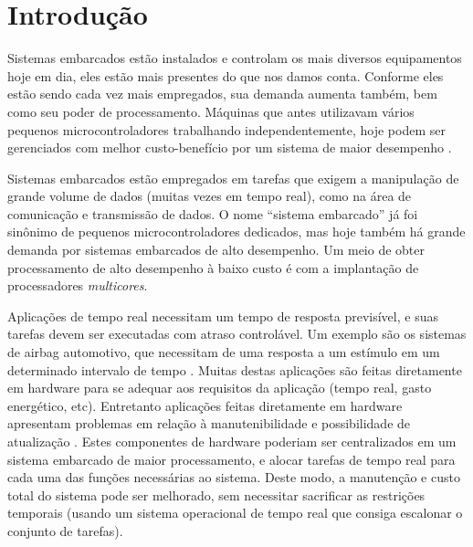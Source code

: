 \chapter{Introdução}


Sistemas embarcados estão instalados e controlam os mais diversos equipamentos hoje em dia, eles estão mais presentes do que nos damos conta. Conforme eles estão sendo cada vez mais empregados, sua demanda aumenta também, bem como seu poder de processamento. Máquinas que antes utilizavam vários pequenos microcontroladores trabalhando independentemente, hoje podem ser gerenciados com melhor custo-benefício por um sistema de maior desempenho \cite{gio}.%


Sistemas embarcados estão empregados em tarefas que exigem a manipulação de grande volume de dados (muitas vezes em tempo real), como na área de comunicação e transmissão de dados. O nome ``sistema embarcado'' já foi sinônimo de pequenos microcontroladores dedicados, mas hoje também há grande demanda por sistemas embarcados de alto desempenho. Um meio de obter processamento de alto desempenho à baixo custo é com a implantação de processadores \emph{multicores}.

Aplicações de tempo real necessitam um tempo de resposta previsível, e suas tarefas devem ser executadas com atraso controlável. Um exemplo são os sistemas de airbag automotivo, que necessitam de uma resposta a um estímulo em um determinado intervalo de tempo \cite{nat}. Muitas destas aplicações são feitas diretamente em hardware para se adequar aos requisitos da aplicação (tempo real, gasto energético, etc). Entretanto aplicações feitas diretamente em hardware apresentam problemas em relação à manutenibilidade e possibilidade de atualização \cite{gio}. Estes componentes de hardware poderiam ser centralizados em um sistema embarcado de maior processamento, e alocar tarefas de tempo real para cada uma das funções necessárias ao sistema. Deste modo, a manutenção e custo total do sistema pode ser melhorado, sem necessitar sacrificar as restrições temporais (usando um sistema operacional de tempo real que consiga escalonar o conjunto de tarefas).

